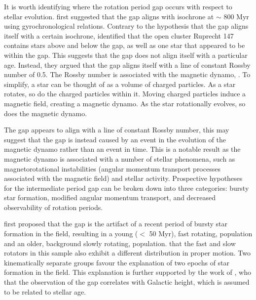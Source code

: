 It is worth identifying where the rotation period gap occurs with respect to stellar evolution.
\citet{reinhold_transition_2019} first suggested that the gap aligns with isochrone at $\sim$ 800 Myr using \citet{barnes_simple_2010} gyrochronological relations.
Contrary to the hypothesis that the gap aligns itself with a certain isochrone, \citet{curtis_when_2020} identified that the open cluster Ruprecht 147 contains stars above and below the gap, as well as one star that appeared to be within the gap.
This suggests that the gap does not align itself with a particular age.
Instead, they argued that the gap aligns itself with a line of constant Rossby number of 0.5.
The Rossby number is associated with the magnetic dynamo, \citep[see, e.g.,][]{noyes_rotation_1984, montesinos_new_2001, augustson_rossby_2019}.
To simplify, a star can be thought of as a volume of charged particles.
As a star rotates, so do the charged particles within it.
Moving charged particles induce a magnetic field, creating a magnetic dynamo.
As the star rotationally evolves, so does the magnetic dynamo.

The gap appears to align with a line of constant Rossby number, this may suggest that the gap is instead caused by an event in the evolution of the magnetic dynamo rather than an event in time.
This is a notable result as the magnetic dynamo is associated with a number of stellar phenomena, such as magnetorotational instabilities (angular momentum transport processes associated with the magnetic field) and stellar activity.
Prospective hypotheses for the intermediate period gap can be broken down into three categories: bursty star formation, modified angular momentum transport, and decreased observability of rotation periods.

\citet{mcquillan_rotation_2014} first proposed that the gap is the artifact of a recent period of bursty star formation in the \kepler{} field, resulting in a young ($<$ 50 Myr), fast rotating, population and an older, background slowly rotating, population.
\citet{davenport_rotating_2017}  that the fast and slow rotators in this sample also exhibit a different distribution in proper motion. 
Two kinematically separate groups  favour the explanation of two epochs of star formation in the \kepler{} field. 
This explanation is further supported by the work of \citet{davenport_rotating_2018}, who  that the observation of the gap correlates with Galactic height, which is assumed to be related to stellar age.

